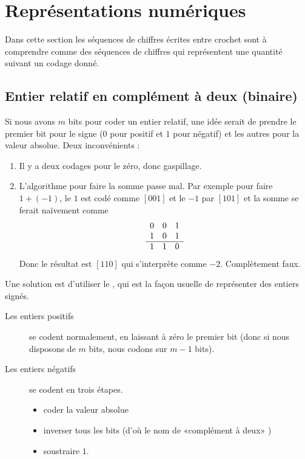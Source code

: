 \section{Représentations numériques}

Dans cette section les séquences de chiffres écrites entre crochet sont à comprendre comme des séquences de chiffres qui représentent une quantité suivant un codage donné.

\subsection{Entier relatif en complément à deux (binaire)}

Si nous avons \( m\) bits pour coder un entier relatif, une idée serait de prendre le premier bit pour le signe (\( 0\) pour positif et \( 1\) pour négatif) et les autres pour la valeur absolue. Deux inconvénients :
\begin{enumerate}
    \item
        Il y a deux codages pour le zéro, donc gaspillage.
    \item
        L'algorithme pour faire la somme passe mal. Par exemple pour faire \( 1+(-1)\), le \( 1\) est codé comme \( [001]\) et le \( -1\) par \( [101]\) et la somme se ferait naïvement comme
        \begin{equation*}
            \begin{array}[]{ccc}
                0&0&1\\
                1&0&1\\
                \hline
                1&1&0\\
            \end{array}
        \end{equation*}
        Donc le résultat est \( [110]\) qui s'interprète comme \( -2\). Complètement faux.
\end{enumerate}
Une solution est d'utiliser le , qui est la façon usuelle de représenter des entiers signés.
\begin{description}
    \item[Les entiers positifs] se codent normalement, en laissant à zéro le premier bit (donc si nous disposons de \( m\) bits, nous codons sur \( m-1\) bits).
    \item[Les entiers négatifs] se codent en trois étapes.
        \begin{itemize}
            \item coder la valeur absolue
            \item inverser tous les bits (d'où le nom de «complément à deux» )
            \item soustraire \( 1\).
        \end{itemize}
\end{description}

